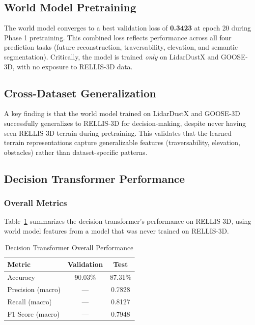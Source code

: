 \documentclass[sensors,article,submit,pdftex,moreauthors]{Definitions/mdpi}
\begin{document}
\subsection{World Model Pretraining}

The world model converges to a best validation loss of \textbf{0.3423} at epoch 20 during Phase 1 pretraining. This combined loss reflects performance across all four prediction tasks (future reconstruction, traversability, elevation, and semantic segmentation). Critically, the model is trained \emph{only} on LidarDustX and GOOSE-3D, with no exposure to RELLIS-3D data.

\subsection{Cross-Dataset Generalization}

A key finding is that the world model trained on LidarDustX and GOOSE-3D successfully generalizes to RELLIS-3D for decision-making, despite never having seen RELLIS-3D terrain during pretraining. This validates that the learned terrain representations capture generalizable features (traversability, elevation, obstacles) rather than dataset-specific patterns.

\subsection{Decision Transformer Performance}

\subsubsection{Overall Metrics}
Table~\ref{tab:overall_results} summarizes the decision transformer's performance on RELLIS-3D, using world model features from a model that was never trained on RELLIS-3D.

\begin{table}[h]
\caption{Decision Transformer Overall Performance}
\label{tab:overall_results}
\centering
\begin{tabular}{lcc}
\toprule
Metric & Validation & Test \\
\midrule
Accuracy & 90.03\% & 87.31\% \\
Precision (macro) & --- & 0.7828 \\
Recall (macro) & --- & 0.8127 \\
F1 Score (macro) & --- & 0.7948 \\
\bottomrule
\end{tabular}
\end{table}
\end{document}

